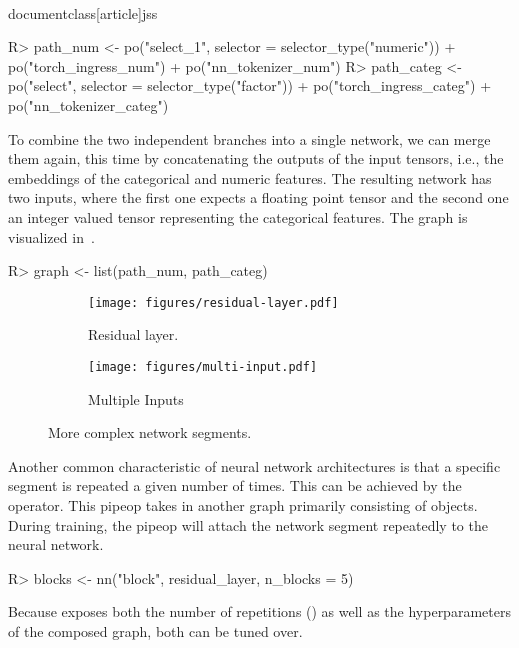 \\documentclass[article]{jss}
\theoremstyle{definition}
\begin{document}
\begin{CodeInput}
R> path_num <- po("select_1", selector = selector_type("numeric")) %
+    po("torch_ingress_num") %
+    po("nn_tokenizer_num")
R> path_categ <- po("select", selector = selector_type("factor")) %
+    po("torch_ingress_categ") %
+    po("nn_tokenizer_categ")
\end{CodeInput}

To combine the two independent branches into a single network, we can merge them again, this time by concatenating the outputs of the input tensors, i.e., the embeddings of the categorical and numeric features.
The resulting network has two inputs, where the first one expects a floating point tensor and the second one an integer valued tensor representing the categorical features.
The graph is visualized in~.

\begin{CodeInput}
R> graph <- list(path_num, path_categ) %
\end{CodeInput}

\begin{figure}[h]
    \centering
    \begin{subfigure}{0.38\textwidth}
        \centering
        \texttt{[image: figures/residual-layer.pdf]}
        \caption{Residual layer.}
        \label{fig:residual-layer}
    \end{subfigure}
    \hfill
    \begin{subfigure}{0.58\textwidth}
        \centering
        \texttt{[image: figures/multi-input.pdf]}
        \caption{Multiple Inputs}
        \label{fig:multi-inputs}
    \end{subfigure}
    \caption{More complex network segments.}
    \label{fig:side-by-side}
\end{figure}

Another common characteristic of neural network architectures is that a specific segment is repeated a given number of times.
This can be achieved by the  operator.
This pipeop takes in another graph primarily consisting of  objects.
During training, the pipeop will attach the network segment repeatedly to the neural network.

\begin{CodeInput}
R> blocks <- nn("block", residual_layer, n_blocks = 5)
\end{CodeInput}

Because  exposes both the number of repetitions () as well as the hyperparameters of the composed graph, both can be tuned over.
\end{document}
